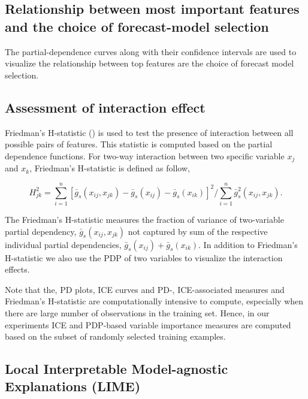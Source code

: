 \documentclass[11pt,a4paper,]{article}
\begin{document}
\hypertarget{relationship-between-most-important-features-and-the-choice-of-forecast-model-selection}{%
\subsection{Relationship between most important features and the choice of forecast-model selection}\label{relationship-between-most-important-features-and-the-choice-of-forecast-model-selection}}

The partial-dependence curves along with their confidence intervals are used to visualize the relationship between top features are the choice of forecast model selection.

\hypertarget{assessment-of-interaction-effect}{%
\subsection{Assessment of interaction effect}\label{assessment-of-interaction-effect}}

Friedman's H-statistic (\textcite{friedman2008predictive}) is used to test the presence of interaction between all possible pairs of features. This statistic is computed based on the partial dependence functions. For two-way interaction between two specific variable \(x_j\) and \(x_k\), Friedman's H-statistic is defined as follow,

\[H_{jk}^2=\sum_{i=1}^{n}[\bar{g}_{s}(x_{ij}, x_{jk})-\bar{g}_{s}(x_{ij})-\bar{g}_{s}(x_{ik})]^2/\sum_{i=1}^{n}\bar{g}^2_{s}(x_{ij}, x_{jk}).\]

The Friedman's H-statistic measures the fraction of variance of two-variable partial dependency, \(\bar{g}_{s}(x_{ij}, x_{jk})\) not captured by sum of the respective individual partial dependencies, \(\bar{g}_{s}(x_{ij})+\bar{g}_{s}(x_{ik})\). In addition to Friedman's H-statistic we also use the PDP of two variables to visualize the interaction effects.

Note that the, PD plots, ICE curves and PD-, ICE-associated measures and Friedman's H-statistic are computationally intensive to compute, especially when there are large number of observations in the training set. Hence, in our experiments ICE and PDP-based variable importance measures are computed based on the subset of randomly selected training examples.

\hypertarget{local-interpretable-model-agnostic-explanations-lime}{%
\subsection{Local Interpretable Model-agnostic Explanations (LIME)}\label{local-interpretable-model-agnostic-explanations-lime}}
\end{document}
